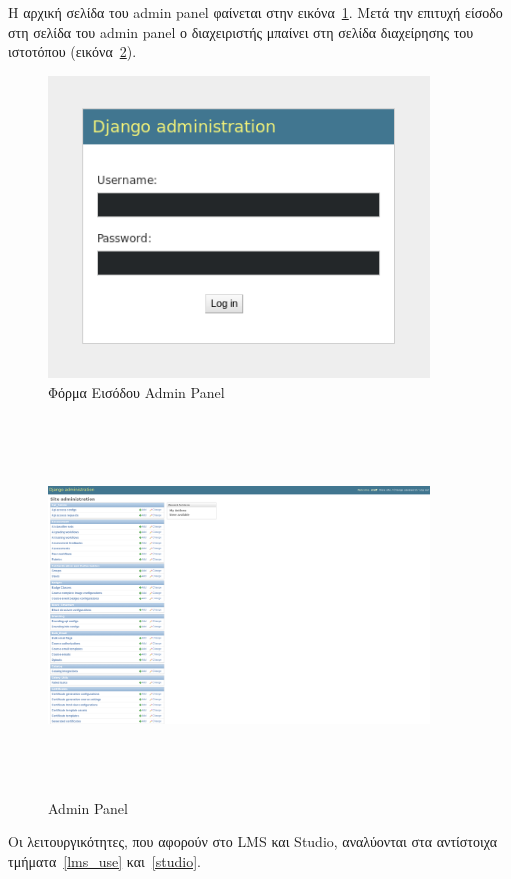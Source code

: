 \documentclass[12pt]{report}
\begin{document}
Η αρχική σελίδα του \textlatin{admin panel} φαίνεται στην εικόνα~\ref{fig:django-login}. Μετά την επιτυχή είσοδο στη σελίδα του \textlatin{admin panel} ο διαχειριστής μπαίνει στη σελίδα διαχείρησης του ιστοτόπου (εικόνα~\ref{fig:django-landing}).
\begin{figure}[!htbp]
\centering
\includegraphics[width=0.9\textwidth, height=8cm]{django-login}
\caption{Φόρμα Εισόδου \textlatin{Admin Panel}}
\label{fig:django-login}
\end{figure}

\begin{figure}[!htbp]
\centering
\includegraphics[width=0.9\textwidth, height=10cm]{django-landing-page}
\caption{\textlatin{Admin Panel}}
\label{fig:django-landing}
\end{figure}

Οι λειτουργικότητες, που αφορούν στο \textlatin{LMS} και \textlatin{Studio}, αναλύονται στα αντίστοιχα τμήματα~\ref{lms_use} και~\ref{studio}.
\end{document}
